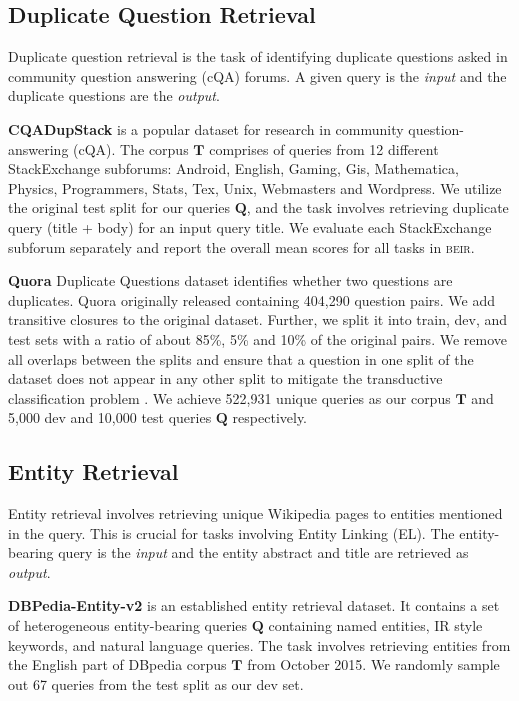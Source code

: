 \documentclass{article}
\newcommand{\custo}[1]{\textsc{\normalsize #1}}
\newcommand{\beir}{\custo{beir}\xspace}
\begin{document}
\vspace{-2mm}
\subsection{Duplicate Question Retrieval}
\vspace{-1mm}

Duplicate question retrieval is the task of identifying duplicate questions asked in community question answering (cQA) forums. A given query is the \textit{input} and the duplicate questions are the \textit{output}.

\textbf{CQADupStack} \cite{hoogeveen2015cqadupstack} is a popular dataset for research in community question-answering (cQA). The corpus $\mathbf{T}$ comprises of queries from 12 different StackExchange subforums: Android, English, Gaming, Gis, Mathematica, Physics, Programmers, Stats, Tex, Unix, Webmasters and Wordpress. We utilize the original test split for our queries $\mathbf{Q}$, and the task involves retrieving duplicate query (title + body) for an input query title. We evaluate each StackExchange subforum separately and report the overall mean scores for all tasks in \beir.

\textbf{Quora} Duplicate Questions dataset identifies whether two questions are duplicates. Quora originally released containing 404,290 question pairs. We add transitive closures to the original dataset. Further, we split it into train, dev, and test sets with a ratio of about 85\%, 5\% and 10\% of the original pairs. We remove all overlaps between the splits and ensure that a question in one split of the dataset does not appear in any other split to mitigate the transductive classification problem \cite{10.1007/978-3-642-15880-3_42}. We achieve 522,931 unique queries as our corpus $\mathbf{T}$ and 5,000 dev and 10,000 test queries $\mathbf{Q}$ respectively.

\vspace{-2mm}
\subsection{Entity Retrieval}
\vspace{-1mm}
Entity retrieval involves retrieving unique Wikipedia pages to entities mentioned in the query. This is crucial for tasks involving Entity Linking (EL). The entity-bearing query is the \textit{input} and the entity abstract and title are retrieved as \textit{output}.

\textbf{DBPedia-Entity-v2} \cite{Hasibi:2017:DVT} is an established entity retrieval dataset. It contains a set of heterogeneous entity-bearing queries $\mathbf{Q}$ containing named entities, IR style keywords, and natural language queries. The task involves retrieving entities from the English part of DBpedia corpus $\mathbf{T}$ from October 2015. We randomly sample out 67 queries from the test split as our dev set.
\end{document}
